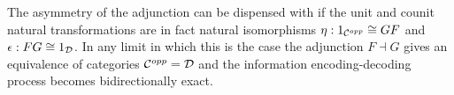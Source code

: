 \begin{frame}
The asymmetry of the adjunction can be dispensed with if the unit and counit natural transformations are in fact natural isomorphisms $\eta: 1_{{\mathcal C}^{opp}} \cong GF$ and $\epsilon: FG \cong 1_{{\mathcal D}}$. In any limit in which this is the case the adjunction $F \dashv G$ gives an equivalence of categories ${\mathcal C}^{opp} = {\mathcal D}$ and the information encoding-decoding process becomes bidirectionally exact.
\end{frame}